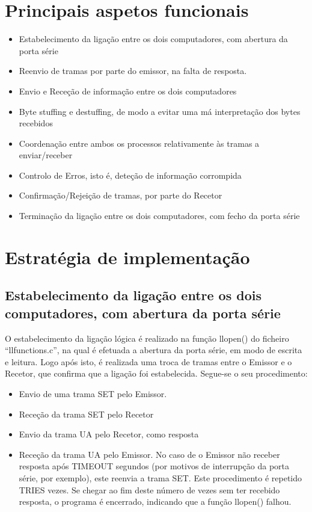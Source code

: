 \documentclass[article, a4paper, 11pt, oneside]{memoir}
\begin{document}
\section{Principais aspetos funcionais}
\begin{itemize}
 \item Estabelecimento da ligação entre os dois computadores, com abertura da porta série
 \item Reenvio de tramas por parte do emissor, na falta de resposta.
 \item Envio e Receção de informação entre os dois computadores
 \item Byte stuffing e destuffing, de modo a evitar uma má interpretação dos bytes recebidos
 \item Coordenação entre ambos os processos relativamente às tramas a enviar/receber
 \item Controlo de Erros, isto é, deteção de informação corrompida
 \item Confirmação/Rejeição de tramas, por parte do Recetor
 \item Terminação da ligação entre os dois computadores, com fecho da porta série
\end{itemize}

\section{Estratégia de implementação}

\subsection{Estabelecimento da ligação entre os dois computadores, com abertura da porta série}
O estabelecimento da ligação lógica é realizado na função llopen() do ficheiro “llfunctions.c”, na qual é efetuada a abertura da porta série, em modo de escrita e leitura. Logo após isto, é realizada uma troca de tramas entre o Emissor e o Recetor, que confirma que a ligação foi estabelecida. Segue-se o seu procedimento:
\begin{itemize}
	\item Envio de uma trama SET pelo Emissor.
\item Receção da trama SET pelo Recetor
\item Envio da trama UA pelo Recetor, como resposta
\item Receção da trama UA pelo Emissor. No caso de o Emissor não receber resposta após TIMEOUT segundos (por motivos de interrupção da porta série, por exemplo), este reenvia a trama SET. Este procedimento é repetido TRIES vezes. Se chegar ao fim deste número de vezes sem ter recebido resposta, o programa é encerrado, indicando que a função llopen() falhou.
\end{itemize}
\end{document}
